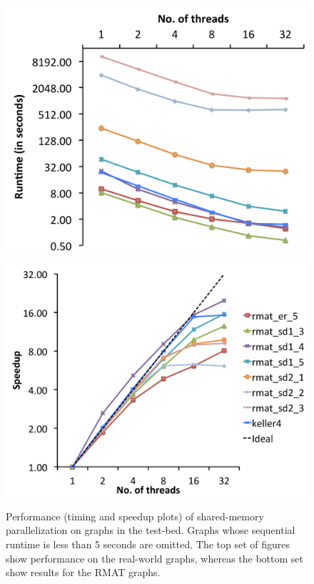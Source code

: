 \begin{figure}
    \includegraphics[scale=0.17]{parallel_other_timing.pdf}
    \includegraphics[scale=0.17]{parallel_other_speedup.pdf}
    
 \caption{Performance (timing and speedup plots) of shared-memory parallelization on graphs in the test-bed. Graphs whose sequential runtime is less than 5 seconds are omitted. The top set of figures show performance on the real-world graphs, whereas the bottom set show results for the RMAT graphs.}
\label{fig-parallel_perf}
\end{figure}


